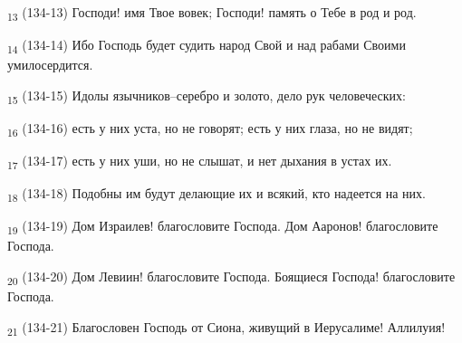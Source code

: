 \begin{tcolorbox}
\textsubscript{13} (134-13) Господи! имя Твое вовек; Господи! память о Тебе в род и род.
\end{tcolorbox}
\begin{tcolorbox}
\textsubscript{14} (134-14) Ибо Господь будет судить народ Свой и над рабами Своими умилосердится.
\end{tcolorbox}
\begin{tcolorbox}
\textsubscript{15} (134-15) Идолы язычников--серебро и золото, дело рук человеческих:
\end{tcolorbox}
\begin{tcolorbox}
\textsubscript{16} (134-16) есть у них уста, но не говорят; есть у них глаза, но не видят;
\end{tcolorbox}
\begin{tcolorbox}
\textsubscript{17} (134-17) есть у них уши, но не слышат, и нет дыхания в устах их.
\end{tcolorbox}
\begin{tcolorbox}
\textsubscript{18} (134-18) Подобны им будут делающие их и всякий, кто надеется на них.
\end{tcolorbox}
\begin{tcolorbox}
\textsubscript{19} (134-19) Дом Израилев! благословите Господа. Дом Ааронов! благословите Господа.
\end{tcolorbox}
\begin{tcolorbox}
\textsubscript{20} (134-20) Дом Левиин! благословите Господа. Боящиеся Господа! благословите Господа.
\end{tcolorbox}
\begin{tcolorbox}
\textsubscript{21} (134-21) Благословен Господь от Сиона, живущий в Иерусалиме! Аллилуия!
\end{tcolorbox}
